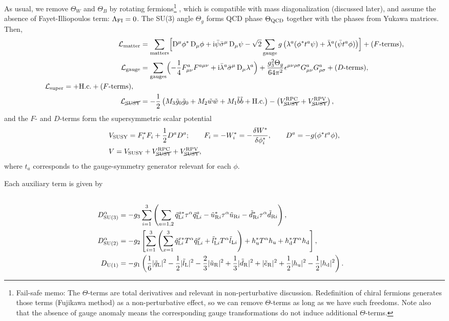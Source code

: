 \documentclass[CheatSheet]{subfiles}
\begin{document}
As usual, we remove $\Theta_W$ and $\Theta_B$ by rotating fermions\footnote{%
Fail-safe memo:
The $\Theta$-terms are total derivatives and relevant in non-perturbative discussion.
Redefinition of chiral fermions generates those terms (Fujikawa method) as a non-perturbative effect, so we can remove $\Theta$-terms as long as we have such freedoms.
Note also that the absence of gauge anomaly means the corresponding gauge transformations do not induce additional $\Theta$-terms.
}
, which is compatible with mass diagonalization (discussed later), and assume the absence of Fayet-Illiopoulos term: $\Lambda_{\mathrm{FI}}=0$.
The SU(3) angle $\Theta_g$ forms QCD phase $\Theta_{\mathrm{QCD}}$ together with the phases from Yukawa matrices.
Then,
\begin{align}
 \mathcal L\w{matter} &= \sum\w{matters}\Bigl[\DD^\mu\phi^*\DD_\mu\phi+\ii\bpsi\bsigma^\mu\DD_\mu\psi
- \sqrt2\sum\w{gauge} g\left(\lambda^a(\phi^*t^a\psi)+\blambda^a(\bpsi t^a\phi)\right)
\Bigr] + \text{($F$-terms)},\\
 \mathcal L\w{gauge} &= \sum\w{gauges}\Bigl(-\frac14F^a_{\mu\nu}F^{a\mu\nu}+\ii\blambda^a\bsigma^\mu\DD_\mu\lambda^a\Bigr) + \frac{g_3^2\Theta_g}{64\pi^2}\epsilon^{\mu\nu\rho\sigma}G^a_{\mu\nu}G^a_{\rho\sigma}+ \text{($D$-terms)},
\\
\begin{split}
  \mathcal L\w{super} &=
   
+ \text{H.c.} +\text{($F$-terms)},
\end{split}\\
\mathcal L_{\text{\cancel{SUSY}}}
&=
- \frac12\left(M_3\tig_0\tig_0+M_2\tiw\tiw+M_1\tib\tib+\text{H.c.}\right)
-
\left(
V^{\mathrm{RPC}}_{\text{\cancel{SUSY}}}
+V^{\mathrm{RPV}}_{\text{\cancel{SUSY}}}\right),
\end{align}
and the $F$- and $D$-terms form the supersymmetric scalar potential
\begin{align}
& V_{\mathrm{SUSY}} = F^{*}_i F_i+\frac12 D^aD^a;
\qquad
 F_i = -W_i^* = -\frac{\delta W^*}{\delta \phi_i^*},
\qquad
 D^a = -g(\phi^* t^a \phi),
\\
&V=V_{\mathrm{SUSY}} +
V^{\mathrm{RPC}}_{\text{\cancel{SUSY}}}
+V^{\mathrm{RPV}}_{\text{\cancel{SUSY}}},
\end{align}
where $t_a$ corresponds to the gauge-symmetry generator relevant for each $\phi$.

Each auxiliary term is given by
\begin{align}

\\
D\w{SU(3)}^\alpha &= -g_3\sum_{i=1}^3\left(
 \sum_{a=1,2}
  \tqL[i]^{a*} \tau^\alpha \tqL[i]^{a}
- \tuR[i]^{*} \tau^\alpha \tuR[i]
- \tdR[i]^{*} \tau^\alpha \tdR[i]
\right),\\
%
D\w{SU(2)}^\alpha &= -g_2\left[
   \sum_{i=1}^3\left(
  \sum_{x=1}^3 \tqL[i]^{x*}T^\alpha\tqL[i]^{x}
+              \tlL[i]^{*}T^\alpha \tlL[i]
  \right)
+ \hu^*T^\alpha\hu
+ \hd^*T^\alpha\hd
\right],\\
%
 D\w{U(1)} &= -g_1\left(
  \frac16|\tqL|^2
- \frac12|\tlL|^2
- \frac23|\tuR|^2
+ \frac13|\tdR|^2
+        |\teR|^2
+ \frac12|\hu|^2
- \frac12|\hd|^2
\right).
\end{align}
\end{document}
